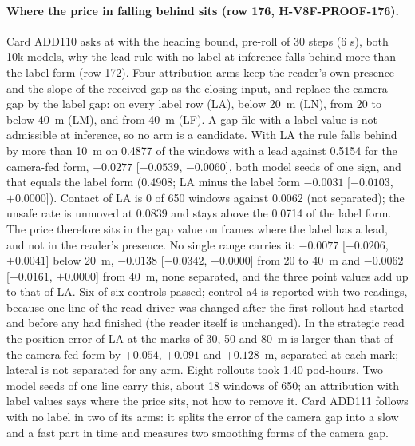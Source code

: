 \paragraph{Where the price in falling behind sits (row 176, H-V8F-PROOF-176).} Card ADD110 asks at  with the heading bound, pre-roll of 30 steps (6 s), both 10k models, why the lead rule with no label at inference falls behind more than the label form (row 172). Four attribution arms keep the reader's own presence and the slope of the received gap as the closing input, and replace the camera gap by the label gap: on every label row (LA), below 20~m (LN), from 20 to below 40~m (LM), and from 40~m (LF). A gap file with a label value is not admissible at inference, so no arm is a candidate. With LA the rule falls behind by more than 10~m on 0.4877 of the windows with a lead against 0.5154 for the camera-fed form, $-0.0277$ [$-0.0539$, $-0.0060$], both model seeds of one sign, and that equals the label form (0.4908; LA minus the label form $-0.0031$ [$-0.0103$, $+0.0000$]). Contact of LA is 0 of 650 windows against 0.0062 (not separated); the unsafe rate is unmoved at 0.0839 and stays above the 0.0714 of the label form. The price therefore sits in the gap value on frames where the label has a lead, and not in the reader's presence. No single range carries it: $-0.0077$ [$-0.0206$, $+0.0041$] below 20~m, $-0.0138$ [$-0.0342$, $+0.0000$] from 20 to 40~m and $-0.0062$ [$-0.0161$, $+0.0000$] from 40~m, none separated, and the three point values add up to that of LA. Six of six controls passed; control a4 is reported with two readings, because one line of the read driver was changed after the first rollout had started and before any had finished (the reader itself is unchanged). In the strategic read the position error of LA at the marks of 30, 50 and 80~m is larger than that of the camera-fed form by $+0.054$, $+0.091$ and $+0.128$~m, separated at each mark; lateral is not separated for any arm. Eight rollouts took 1.40 pod-hours. Two model seeds of one line carry this, about 18 windows of 650; an attribution with label values says where the price sits, not how to remove it. Card ADD111 follows with no label in two of its arms: it splits the error of the camera gap into a slow and a fast part in time and measures two smoothing forms of the camera gap.

